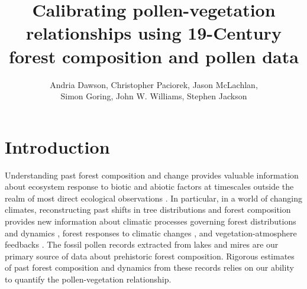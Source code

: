 \documentclass[12pt]{article}
\begin{document}
\nocite{*}

\title{Calibrating pollen-vegetation relationships using 19-Century forest composition and pollen data}

\author{Andria Dawson, Christopher Paciorek, Jason McLachlan,\\ Simon Goring, John W. Williams, Stephen Jackson}

\maketitle

\section{Introduction}
Understanding past forest composition and change provides valuable
information about ecosystem response to biotic and abiotic factors at
timescales outside the realm of most direct ecological observations
\citep{jackson2007looking}. In particular, in a world of changing
climates, reconstructing past shifts in tree distributions and forest
composition provides new information about climatic processes
governing forest distributions and dynamics \citep{goring2015a},
forest responses to climatic changes \citep{williams2009rapid}, and
vegetation-atmosphere feedbacks \citep{matthes2015}. The fossil pollen
records extracted from lakes and mires are our primary source of data
about prehistoric forest composition. Rigorous estimates of past
forest composition and dynamics from these records relies on our
ability to quantify the pollen-vegetation relationship.
\end{document}
